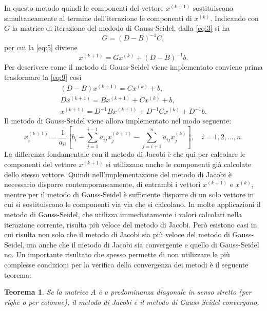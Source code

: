 \documentclass[12pt]{article}
\newtheorem*{remark}{Teorema}
\begin{document}
In questo metodo quindi le componenti del vettore \(x^{(k+1)}\) sostituiscono simultaneamente al termine dell'iterazione le componenti di \(x^{(k)}\).
Indicando con \(G\) la matrice di iterazione del medodo di Gauss-Seidel, dalla \eqref{eq:3} si ha
\begin{equation*}
    G=(D-B)^{-1}C,
\end{equation*}
per cui la \eqref{eq:5} diviene
\begin{equation}
    \label{eq:9}
    x^{(k+1)}=Gx^{(k)}+(D-B)^{-1}b.
\end{equation}
Per descrivere come il metodo di Gauss-Seidel viene implementato conviene prima trasformare la \eqref{eq:9} così
\begin{gather*}
    (D-B)x^{(k+1)}=Cx^{(k)}+b, \\
    Dx^{(k+1)}=Bx^{(k+1)}+Cx^{(k)}+b, \\
    x^{(k+1)}=D^{-1}Bx^{(k+1)}+D^{-1}Cx^{(k)}+D^{-1}b.
\end{gather*}
Il metodo di Gauss-Seidel viene allora implementato nel modo seguente:
\begin{equation}
    \label{eq:10}
    x^{(k+1)}_i= \frac{1}{a_{ii}} \left[ b_i-\sum^{i-1}_{j=1} a_{ij}x^{(k+1)}_{j} - \sum^{n}_{j=i+1} a_{ij}x^{(k)}_j \right], \quad i=1,2,...,n.
\end{equation}
La differenza fondamentale con il metodo di Jacobi è che qui per calcolare le componenti del vettore \(x^{(k+1)}\) si utilizzano anche le componenti già calcolate dello stesso vettore. Quindi nell'implementazione del metodo di Jacobi è necessario disporre contemporaneamente, di entrambi i vettori \(x^{(k+1)}\) e \(x^{(k)}\), mentre per il metodo di Gauss-Seidel è sufficiente disporre di un solo vettore in cui si sostituiscono le componenti via via che si calcolano.
In molte applicazioni il metodo di Gauss-Seidel, che utilizza immediatamente i valori calcolati nella iterazione corrente, risulta più veloce del metodo di Jacobi. Però esistono casi in cui risulta non solo che il metodo di Jacobi sia più veloce del metodo di Gauss-Seidel, ma anche che il metodo di Jacobi sia convergente e quello di Gauss-Seidel no.
Un importante risultato che spesso permette di non utilizzare le più complesse condizioni per la verifica della convergenza dei metodi è il seguente teorema:
\begin{remark}
Se la matrice \(A\) è a predominanza diagonale in senso stretto (per righe o per colonne), il metodo di Jacobi e il metodo di Gauss-Seidel convergono.
\end{remark}
\end{document}
